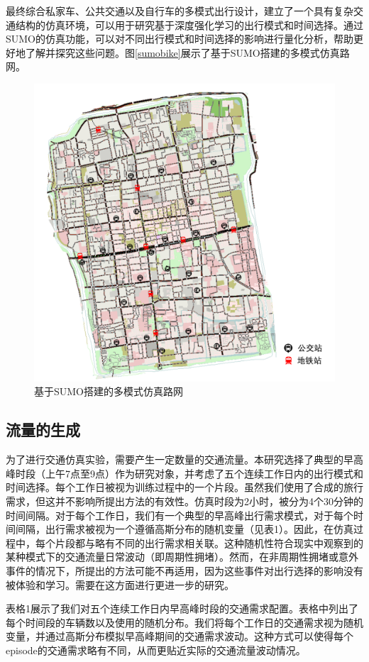 最终综合私家车、公共交通以及自行车的多模式出行设计，建立了一个具有复杂交通结构的仿真环境，可以用于研究基于深度强化学习的出行模式和时间选择。通过SUMO的仿真功能，可以对不同出行模式和时间选择的影响进行量化分析，帮助更好地了解并探究这些问题。图\ref{sumobike}展示了基于SUMO搭建的多模式仿真路网。

\begin{figure}[H]
  \centering
  \includegraphics[width=.65\linewidth]{figures/content/multimodal.png}
  \caption{基于SUMO搭建的多模式仿真路网}
  \label{multimodal}
\end{figure}


\subsection{流量的生成}
为了进行交通仿真实验，需要产生一定数量的交通流量。本研究选择了典型的早高峰时段（上午7点至9点）作为研究对象，并考虑了五个连续工作日内的出行模式和时间选择。每个工作日被视为训练过程中的一个片段。虽然我们使用了合成的旅行需求，但这并不影响所提出方法的有效性。仿真时段为2小时，被分为4个30分钟的时间间隔。对于每个工作日，我们有一个典型的早高峰出行需求模式，对于每个时间间隔，出行需求被视为一个遵循高斯分布的随机变量（见表1）。因此，在仿真过程中，每个片段都与略有不同的出行需求相关联。这种随机性符合现实中观察到的某种模式下的交通流量日常波动（即周期性拥堵）。然而，在非周期性拥堵或意外事件的情况下，所提出的方法可能不再适用，因为这些事件对出行选择的影响没有被体验和学习。需要在这方面进行更进一步的研究。

表格1展示了我们对五个连续工作日内早高峰时段的交通需求配置。表格中列出了每个时间段的车辆数以及使用的随机分布。我们将每个工作日的交通需求视为随机变量，并通过高斯分布模拟早高峰期间的交通需求波动。这种方式可以使得每个episode的交通需求略有不同，从而更贴近实际的交通流量波动情况。

